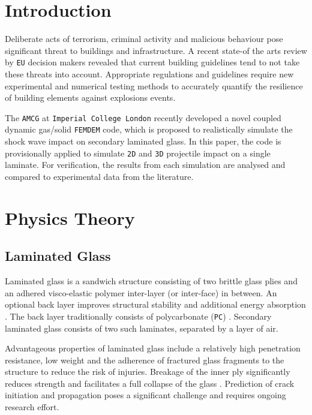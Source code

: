 \documentclass[12pt,twoside]{article}
\theoremstyle{break}
\begin{document}
\section{Introduction}

Deliberate acts of terrorism, criminal activity and malicious behaviour pose significant threat to buildings and infrastructure. A recent state-of the arts review by \texttt{EU} decision makers revealed that current building guidelines tend to not take these threats into account. Appropriate regulations and guidelines require new experimental and numerical testing methods to accurately quantify the resilience of building elements against explosions events.

\bigbreak
The \texttt{AMCG} at \texttt{Imperial College London} recently developed a novel coupled dynamic gas/solid \texttt{FEMDEM} code, which is proposed to realistically simulate the shock wave impact on secondary laminated glass. In this paper, the code is provisionally applied to simulate \texttt{2D} and \texttt{3D} projectile impact on a single laminate. For verification, the results from each simulation are analysed and compared to experimental data from the literature.

\section{Physics Theory}

\subsection{Laminated Glass}


Laminated glass is a sandwich structure consisting of two brittle glass plies and an adhered visco-elastic polymer inter-layer (or inter-face) in between. An optional back layer improves structural stability and additional energy absorption \cite{Bio10, Bra10}. The back layer traditionally consists of polycarbonate (\texttt{PC}) \cite{Mon04, Bra10}. Secondary laminated glass consists of two such laminates, separated by a layer of air.

\bigbreak
Advantageous properties of laminated glass include a relatively high penetration resistance, low weight \cite{Wu14} and the adherence of fractured glass fragments to the structure to reduce the risk of injuries\cite{Che17, Flo98, Ji98}. Breakage of the inner ply significantly reduces strength and facilitates a full collapse of the glass \cite{Flo98}. Prediction of crack initiation and propagation poses a significant challenge and requires ongoing research effort.
\end{document}
